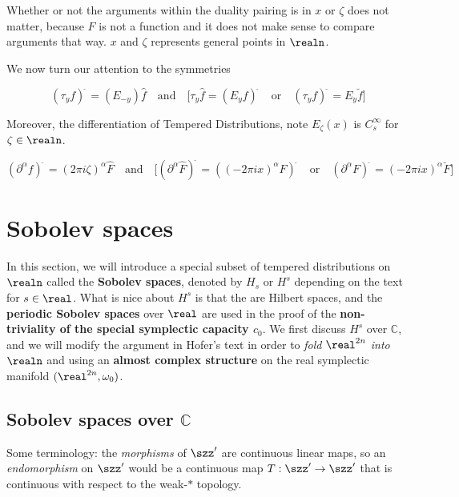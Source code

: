 Whether or not the arguments within the duality pairing is in \(x\) or
\(\zeta\) does not matter, because \(F\) is not a function and it does
not make sense to compare arguments that way. \(x\) and \(\zeta\)
represents general points in \(\realn\).

We now turn our attention to the symmetries

\[
(\tau_y f)^\hat{\:} = (E_{-y})\hat{f}\quad\text{and}\quad\biggl[ \tau_y\hat{f} = (E_yf)^\hat{\:}\quad\text{or}\quad (\tau_y f)^\breve{\:} = E_y\breve{f}\biggr]
\]

Moreover, the differentiation of Tempered Distributions, note
\(E_{\zeta}(x)\) is \(C_s^\infty\) for \(\zeta\in\realn\).

\[
(\partial^\alpha f)^\hat{\:} = (2\pi i \zeta)^{\alpha}\hat{F}\quad\text{and}\quad \biggl[(\partial^\alpha \hat{F})^{\breve{\:}} = ((-2\pi ix)^{\alpha}F)^{\hat{\:}}\quad\text{or}\quad (\partial^\alpha F)^{\breve{\:}} = (-2\pi i x)^\alpha\breve{F} \biggr]
\]

\hypertarget{sobolev-spaces}{%
\section{Sobolev spaces}\label{sobolev-spaces}}

In this section, we will introduce a special subset of tempered
distributions on \(\realn\) called the \textbf{Sobolev spaces}, denoted
by \(H_s\) or \(H^s\) depending on the text for \(s\in\real\). What is
nice about \(H^s\) is that the are Hilbert spaces, and the
\textbf{periodic Sobolev spaces} over \(\real\) are used in the proof of
the \textbf{non-triviality of the special symplectic capacity \(c_0\)}.
We first discuss \(H^s\) over \(\mathbb{C}\), and we will modify the
argument in Hofer's text in order to \emph{fold \(\real^{2n}\) into
\(\realn\)} and using an \textbf{almost complex structure} on the real
symplectic manifold \((\real^{2n},\omega_0)\).

\hypertarget{sobolev-spaces-over-mathbbc}{%
\subsection{\texorpdfstring{Sobolev spaces over
\(\mathbb{C}\)}{Sobolev spaces over \textbackslash mathbb\{C\}}}\label{sobolev-spaces-over-mathbbc}}

Some terminology: the \emph{morphisms} of \(\szz'\) are continuous
linear maps, so an \emph{endomorphism} on \(\szz'\) would be a
continuous map \(T: \szz'\to\szz'\) that is continuous with respect to
the weak-\(\ast\) topology.

